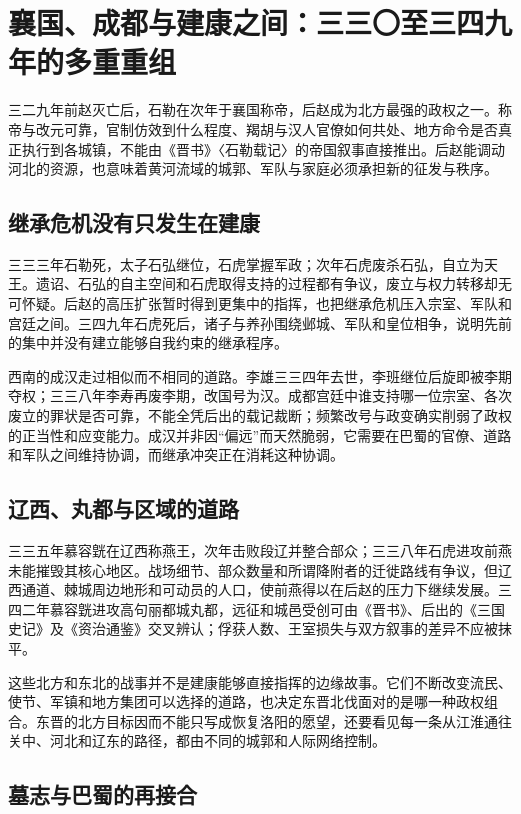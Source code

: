\section{襄国、成都与建康之间：三三〇至三四九年的多重重组}
\label{sec:eastern-jin-post-zhao-chenghan}

三二九年前赵灭亡后，石勒在次年于襄国称帝，后赵成为北方最强的政权之一。称帝与改元可靠，官制仿效到什么程度、羯胡与汉人官僚如何共处、地方命令是否真正执行到各城镇，不能由《晋书》〈石勒载记〉的帝国叙事直接推出。后赵能调动河北的资源，也意味着黄河流域的城郭、军队与家庭必须承担新的征发与秩序。

\subsection{继承危机没有只发生在建康}

三三三年石勒死，太子石弘继位，石虎掌握军政；次年石虎废杀石弘，自立为天王。遗诏、石弘的自主空间和石虎取得支持的过程都有争议，废立与权力转移却无可怀疑。后赵的高压扩张暂时得到更集中的指挥，也把继承危机压入宗室、军队和宫廷之间。三四九年石虎死后，诸子与养孙围绕邺城、军队和皇位相争，说明先前的集中并没有建立能够自我约束的继承程序。

西南的成汉走过相似而不相同的道路。李雄三三四年去世，李班继位后旋即被李期夺权；三三八年李寿再废李期，改国号为汉。成都宫廷中谁支持哪一位宗室、各次废立的罪状是否可靠，不能全凭后出的载记裁断；频繁改号与政变确实削弱了政权的正当性和应变能力。成汉并非因“偏远”而天然脆弱，它需要在巴蜀的官僚、道路和军队之间维持协调，而继承冲突正在消耗这种协调。

\subsection{辽西、丸都与区域的道路}

三三五年慕容皝在辽西称燕王，次年击败段辽并整合部众；三三八年石虎进攻前燕未能摧毁其核心地区。战场细节、部众数量和所谓降附者的迁徙路线有争议，但辽西通道、棘城周边地形和可动员的人口，使前燕得以在后赵的压力下继续发展。三四二年慕容皝进攻高句丽都城丸都，远征和城邑受创可由《晋书》、后出的《三国史记》及《资治通鉴》交叉辨认；俘获人数、王室损失与双方叙事的差异不应被抹平。

这些北方和东北的战事并不是建康能够直接指挥的边缘故事。它们不断改变流民、使节、军镇和地方集团可以选择的道路，也决定东晋北伐面对的是哪一种政权组合。东晋的北方目标因而不能只写成恢复洛阳的愿望，还要看见每一条从江淮通往关中、河北和辽东的路径，都由不同的城郭和人际网络控制。

\subsection{墓志与巴蜀的再接合}

